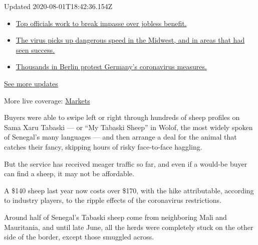 Updated 2020-08-01T18:42:36.154Z

\begin{itemize}
\tightlist
\item
  \href{https://www.nytimes.com/2020/08/01/world/coronavirus-covid-19.html?action=click\&pgtype=Article\&state=default\&region=MAIN_CONTENT_1\&context=storylines_live_updates\#link-3ac56579}{Top
  officials work to break impasse over jobless benefit.}
\item
  \href{https://www.nytimes.com/2020/08/01/world/coronavirus-covid-19.html?action=click\&pgtype=Article\&state=default\&region=MAIN_CONTENT_1\&context=storylines_live_updates\#link-8796723}{The
  virus picks up dangerous speed in the Midwest, and in areas that had
  seen success.}
\item
  \href{https://www.nytimes.com/2020/08/01/world/coronavirus-covid-19.html?action=click\&pgtype=Article\&state=default\&region=MAIN_CONTENT_1\&context=storylines_live_updates\#link-25930521}{Thousands
  in Berlin protest Germany's coronavirus measures.}
\end{itemize}

\href{https://www.nytimes.com/2020/08/01/world/coronavirus-covid-19.html?action=click\&pgtype=Article\&state=default\&region=MAIN_CONTENT_1\&context=storylines_live_updates}{See
more updates}

More live coverage:
\href{https://www.nytimes.com/live/2020/07/31/business/stock-market-today-coronavirus?action=click\&pgtype=Article\&state=default\&region=MAIN_CONTENT_1\&context=storylines_live_updates}{Markets}

Buyers were able to swipe left or right through hundreds of sheep
profiles on Sama Xaru Tabaski --- or ``My Tabaski Sheep'' in Wolof, the
most widely spoken of Senegal's many languages --- and then arrange a
deal for the animal that catches their fancy, skipping hours of risky
face-to-face haggling.

But the service has received meager traffic so far, and even if a
would-be buyer can find a sheep, it may not be affordable.

A \$140 sheep last year now costs over \$170, with the hike
attributable, according to industry players, to the ripple effects of
the coronavirus restrictions.

Around half of Senegal's Tabaski sheep come from neighboring Mali and
Mauritania, and until late June, all the herds were completely stuck on
the other side of the border, except those smuggled across.

